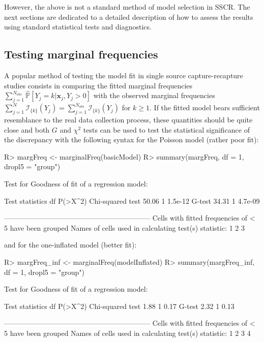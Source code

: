 \documentclass[nojss]{jss}
\newcommand{\1}{\mathcal{I}} \newcommand{\bZero}{\boldsymbol{0}}
\begin{document}
However, the above is not a standard method of model selection in SSCR.
The next sections are dedicated to a detailed description of how to
assess the results using standard statistical tests and diagnostics.

\subsection{Testing marginal
frequencies}\label{testing-marginal-frequencies}

A popular method of testing the model fit in single source
capture-recapture studies consists in comparing the fitted marginal
frequencies
\(\displaystyle\sum_{j=1}^{N_{obs}}\hat{\mathbb{P}}\left[Y_{j}=k|\boldsymbol{x}_{j}, Y_{j} > 0\right]\)
with the observed marginal frequencies
\(\displaystyle\sum_{j=1}^{N}\mathcal{I}_{\{k\}}(Y_{j})=\sum_{j=1}^{N_{obs}}\mathcal{I}_{\{k\}}(Y_{j})\)
for \(k\geq1\). If the fitted model bears sufficient resemblance to the
real data collection process, these quantities should be quite close and
both \(G\) and \(\chi^{2}\) tests can be used to test the statistical
significance of the discrepancy with the following 
syntax for the Poisson model (rather poor fit):

\begin{CodeChunk}
\begin{CodeInput}
R> margFreq <- marginalFreq(basicModel)
R> summary(margFreq, df = 1, dropl5 = "group")
\end{CodeInput}
\begin{CodeOutput}
Test for Goodness of fit of a regression model:

                 Test statistics df P(>X^2)
Chi-squared test           50.06  1 1.5e-12
G-test                     34.31  1 4.7e-09

--------------------------------------------------------------
Cells with fitted frequencies of < 5 have been grouped
Names of cells used in calculating test(s) statistic: 1 2 3
\end{CodeOutput}
\end{CodeChunk}

and for the one-inflated model (better fit):

\begin{CodeChunk}
\begin{CodeInput}
R> margFreq_inf <- marginalFreq(modelInflated)
R> summary(margFreq_inf, df = 1, dropl5 = "group")
\end{CodeInput}
\begin{CodeOutput}
Test for Goodness of fit of a regression model:

                 Test statistics df P(>X^2)
Chi-squared test            1.88  1    0.17
G-test                      2.32  1    0.13

--------------------------------------------------------------
Cells with fitted frequencies of < 5 have been grouped
Names of cells used in calculating test(s) statistic: 1 2 3 4
\end{CodeOutput}
\end{CodeChunk}
\end{document}
